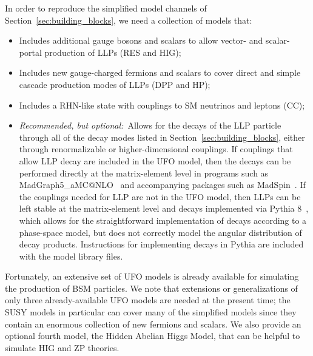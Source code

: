 In order to reproduce the simplified model channels of Section~\ref{sec:building_blocks}, we need a collection of models that:
%
\begin{itemize}
\item Includes additional gauge bosons and scalars to allow vector- and scalar-portal production of LLPs (RES and HIG);
\item Includes new gauge-charged fermions and scalars to cover direct and simple cascade production modes of LLPs (DPP and HP); 
\item Includes a RHN-like state with couplings to SM neutrinos and leptons (CC);
\item \emph{Recommended, but optional:}~Allows for the decays of the LLP particle through all of the decay modes listed in Section~\ref{sec:building_blocks}, either through renormalizable or higher-dimensional couplings.
If couplings that allow LLP decay are included in the UFO model, then the decays can be performed directly at the matrix-element level in programs such as MadGraph5\_aMC@NLO~\cite{Alwall:2014hca} and accompanying packages such as MadSpin~\cite{Artoisenet:2012st}.
If the couplings needed for LLP are not in the UFO model, then LLPs can be left stable at the matrix-element level and decays implemented via Pythia 8~\cite{Sjostrand:2007gs,Sjostrand:2014zea}, which allows for the straightforward implementation of decays according to a phase-space model, but does not correctly model the angular distribution of decay products.
Instructions for implementing decays in Pythia are included with the model library files.
\end{itemize}

Fortunately, an extensive set of UFO models is already available for simulating the production of BSM particles.
We note that extensions or generalizations of only three already-available UFO models are needed at the present time; the SUSY models
in particular can cover many of the simplified models since they contain an enormous collection of new fermions and scalars.
We also provide an optional
fourth model, the Hidden Abelian Higgs Model, that can be helpful to simulate HIG and ZP theories.

